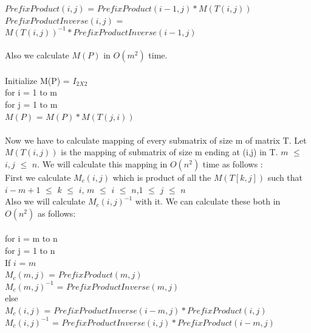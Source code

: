 \documentclass{article}
\begin{document}
\hspace*{2cm} $PrefixProduct(i,j)$ = $PrefixProduct(i-1,j)*M(T(i,j))$ \\
\hspace*{2cm} $PrefixProductInverse(i,j)$ = $M(T(i,j))^{-1}*PrefixProductInverse(i-1,j)$ \\ \\
Also we calculate $M(P)$ in $O(m^{2})$ time. \\\\ 
Initialize M(P) = $I_{2X2}$ \\
for i = 1 to m \\ 
\hspace*{1cm}for j = 1 to m \\  
\hspace*{2cm} $M(P)$ = $M(P) * M(T(j,i))$ \\\\
Now we have to calculate mapping of every submatrix of size m of matrix T. Let $M(T(i,j))$ is the mapping of submatrix of size m ending at (i,j) in T. $m$ $\leq$ $i,j$ $\leq$ $n$. We will calculate this mapping in $O(n^{2})$ time as follows : \\
First we calculate $M_c(i,j)$ which is product of all the $M(T[k,j])$
such that $i - m + 1$ $\leq$ $k$ $\leq$ $i$, $m$ $\leq$ $i$ $\leq$ $n$,$1$ $\leq$ $j$ $\leq$ $n$ \\
Also we will calculate $M_c(i,j)^{-1}$ with it. 
We can calculate these both in $O(n^{2})$ as follows:\\\\
\hspace*{1cm}for i = m to n \\
\hspace*{2cm}	for j = 1 to n\\ 
\hspace*{3cm} If $i$ = $m$ \\
\hspace*{4cm} $M_c(m,j)$ = $PrefixProduct(m,j)$ \\
\hspace*{4cm} $M_c(m,j)^{-1}$ = $PrefixProductInverse(m,j)$ \\
\hspace*{3cm}else \\
\hspace*{4cm} $M_c(i,j)$ = $PrefixProductInverse(i-m,j)*PrefixProduct(i,j)$ \\
\hspace*{4cm} $M_c(i,j)^{-1}$ = $PrefixProductInverse(i,j)*PrefixProduct(i-m,j)$ \\\\ 
\end{document}
